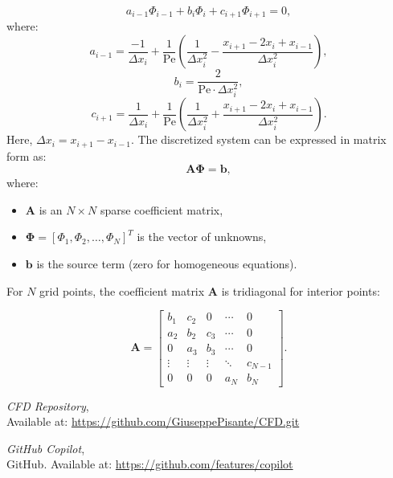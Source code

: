 \documentclass{article}
\begin{document}
\[
a_{i-1} \Phi_{i-1} + b_i \Phi_i + c_{i+1} \Phi_{i+1} = 0,
\]
where:
\[
a_{i-1} = \frac{-1}{\Delta x_i} + \frac{1}{\text{Pe}} \left( \frac{1}{\Delta x_i^2} - \frac{x_{i+1} - 2x_i + x_{i-1}}{\Delta x_i^2} \right),
\]
\[
b_i = \frac{2}{\text{Pe} \cdot \Delta x_i^2},
\]
\[
c_{i+1} = \frac{1}{\Delta x_i} + \frac{1}{\text{Pe}} \left( \frac{1}{\Delta x_i^2} + \frac{x_{i+1} - 2x_i + x_{i-1}}{\Delta x_i^2} \right).
\]
Here, \(\Delta x_i = x_{i+1} - x_{i-1}\).
The discretized system can be expressed in matrix form as:
\[
\mathbf{A} \boldsymbol{\Phi} = \mathbf{b},
\]
where:
\begin{itemize}
    \item \(\mathbf{A}\) is an \(N \times N\) sparse coefficient matrix,
    \item \(\boldsymbol{\Phi} = [\Phi_1, \Phi_2, \dots, \Phi_N]^T\) is the vector of unknowns,
    \item \(\mathbf{b}\) is the source term (zero for homogeneous equations).
\end{itemize}
For \(N\) grid points, the coefficient matrix \(\mathbf{A}\) is tridiagonal for interior points:

\[
\mathbf{A} =
\begin{bmatrix}
b_1 & c_2 & 0 & \cdots & 0 \\
a_2 & b_2 & c_3 & \cdots & 0 \\
0 & a_3 & b_3 & \cdots & 0 \\
\vdots & \vdots & \vdots & \ddots & c_{N-1} \\
0 & 0 & 0 & a_{N} & b_{N}
\end{bmatrix}.
\]







\begin{thebibliography}{9}
    \textit{CFD Repository},\\
    Available at: \url{https://github.com/GiuseppePisante/CFD.git}
    
    \textit{GitHub Copilot},\\
    GitHub. Available at: \url{https://github.com/features/copilot}
  \end{thebibliography}
  
  
\end{document}
